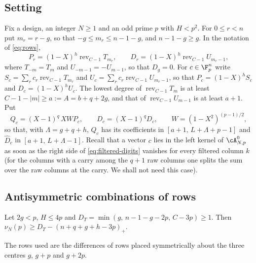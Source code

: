 \subsection{Setting}
Fix a design, an integer $N\ge1$ and an odd prime $p$ with $H<p^2$. For $0\le r<n$ put $m_r=r-g$, so that
$-g\le m_r\le n-1-g$, and $n-1-g\ge g$. In the notation of \eqref{eq:rows},
\[
 P_r=(1-X)^h\operatorname{rev}_{C-1}T_{m_r},\qquad D_r=(1-X)^h\operatorname{rev}_{C-1}U_{m_r-1},
\]
where $T_{-m}=T_m$ and $U_{-m-1}=-U_{m-1}$, so that $D_g=0$. For $c\in\F_p^n$ write
$S_c=\sum_rc_r\operatorname{rev}_{C-1}T_{m_r}$ and $U_c=\sum_rc_r\operatorname{rev}_{C-1}U_{m_r-1}$, so that $P_c=(1-X)^hS_c$
and $D_c=(1-X)^hU_c$. The lowest degree of $\operatorname{rev}_{C-1}T_m$ is at least $C-1-|m|\ge a:=A=b+q+2g$, and that of
$\operatorname{rev}_{C-1}U_{m-1}$ is at least $a+1$. Put
\[
 Q_c=(X-1)^q\,XWP_c,\qquad \widehat D_c=(X-1)^qD_c,\qquad W=(1-X^2)^{(p-1)/2},
\]
so that, with $\Lambda=g+q+h$, $Q_c$ has its coefficients in $[a+1,\,L+\Lambda+p-1]$ and $\widehat D_c$ in
$[a+1,\,L+\Lambda-1]$. Recall that a vector $c$ lies in the left kernel of $\cA^0_{N,p}$ as soon as the
right side of \eqref{eq:filtered-digits} vanishes for every filtered column $k$ (for the columns with a
carry among the $q+1$ raw columns one splits the sum over the raw columns at the carry. We shall not need
this case).

\subsection{Antisymmetric combinations of rows}
\begin{theorem}\label{thm:T}
Let $2g<p$, $H\le4p$ and $D_T=\min(g,\,n-1-g-2p,\,C-3p)\ge1$. Then
$\nu_N(p)\ge D_T-(n+q+g+h-3p)_+$.
\end{theorem}

The rows used are the differences of rows placed symmetrically about the three centres $g$, $g+p$ and
$g+2p$.

